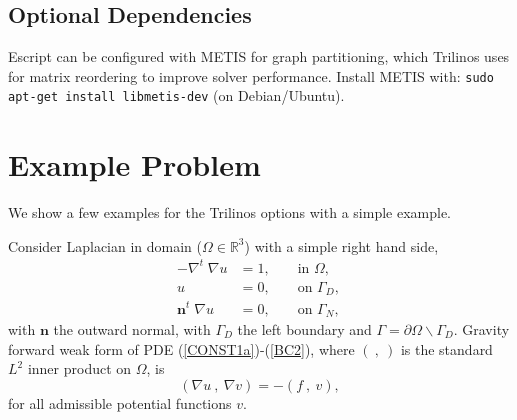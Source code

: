 \subsection{Optional Dependencies}
Escript can be configured with METIS for graph partitioning, which Trilinos uses for matrix reordering to improve solver performance.
Install METIS with: \texttt{sudo apt-get install libmetis-dev} (on Debian/Ubuntu).

\section{Example Problem}
We show a few examples for the Trilinos options with a simple example.

Consider Laplacian in domain ($\Omega\in \mathbb{R}^3$) with a simple right hand side,
\begin{align}
 -\nabla^t\; \nabla u &= 1,  &&\text{ in } \Omega, \label{CONST1a}\\
 u &= 0, &&\text{ on } \Gamma_D,\label{BC1}\\
 \mathbf{n}^t \; \nabla u &= 0, &&\text{ on }\Gamma_N,\,\label{BC2}
\end{align} 
with $\mathbf{n}$ the outward normal, with $\Gamma_D$ the left boundary and $\Gamma=\partial\Omega\backslash\Gamma_D$.  Gravity forward weak form of PDE (\ref{CONST1a})-(\ref{BC2}), where $(~,~)$ is the standard $L^2$ inner product on $\Omega$, is
\begin{equation}\label{weak}
(\nabla u ~,~\nabla v ) = -(f ~,~v ),   
\end{equation}
for all admissible potential functions $v$. 



